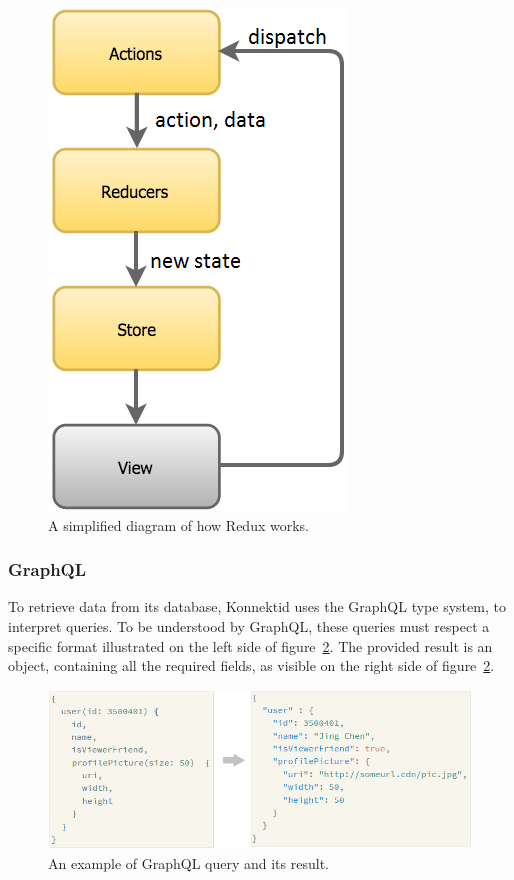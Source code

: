 \begin{figure}[H]
    \centering
    \includegraphics[scale=0.7]{figure/redux_flow.png}
    \caption{A simplified diagram of how Redux works.}
    \label{fig:reduxSumup}
\end{figure}

\subsubsection{GraphQL}
\label{sssec:grqphql}

To retrieve data from its database, Konnektid uses the GraphQL type system, to interpret queries. To be understood by GraphQL, these queries must respect a specific format illustrated on the left side of {\sc figure}~\ref{fig:query}. The provided result is an object, containing all the required fields, as visible on the right side of {\sc figure}~\ref{fig:query}. 

\begin{figure}[H]
    \centering
    \includegraphics[scale=0.8]{figure/query.png}
    \caption{An example of GraphQL query and its result.}
    \label{fig:query}
\end{figure}

